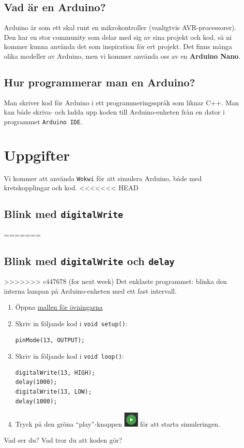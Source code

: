 \documentclass[11pt]{article}
\newcommand{\mallurl}{https://wokwi.com/projects/357812594927244289}
\begin{document}
\subsection{Vad är en Arduino?}
Arduino är som ett skal runt en mikrokontroller (vanligtvis AVR-processorer).
Den har en stor community som delar med sig av sina projekt och kod, så ni
kommer kunna använda det som inspiration för ert projekt. Det finns många olika
modeller av Arduino, men vi kommer använda oss av en \textbf{Arduino Nano}.

\subsection{Hur programmerar man en Arduino?}
Man skriver kod för Arduino i ett programmeringsspråk som liknar C++. Man kan
både skriva- och ladda upp koden till Arduino-enheten från en dator i
programmet \texttt{Arduino IDE}.

\newpage
\onehalfspacing
\section{Uppgifter}
Vi kommer att använda \texttt{Wokwi} för att simulera Arduino, både med
kretskopplingar och kod.
<<<<<<< HEAD
\subsection{Blink med \texttt{digitalWrite}}\label{sec:blink}
=======
\subsection{Blink med \texttt{digitalWrite} och \texttt{delay}}\label{sec:blink}
>>>>>>> c447678 (for next week)
Det enklaste programmet: blinka den interna lampan på Arduino-enheten med ett
fast intervall.

\begin{enumerate}[itemsep=1em]
      \item
            Öppna \href{\mallurl}{mallen för övningarna}
      \item
            Skriv in följande kod i \texttt{void setup()}:

            \begin{lstlisting}
pinMode(13, OUTPUT);
       \end{lstlisting}
      \item
            Skriv in följande kod i \texttt{void loop()}:

            \begin{lstlisting}
digitalWrite(13, HIGH);
delay(1000);
digitalWrite(13, LOW);
delay(1000);
       \end{lstlisting}
      \item
            Tryck på den gröna ``play''-knappen
            \includegraphics[width=2em,valign=c]{play} för att starta
            simuleringen.
\end{enumerate}
\vspace{1em}
Vad ser du? Vad tror du att koden gör?
\end{document}
